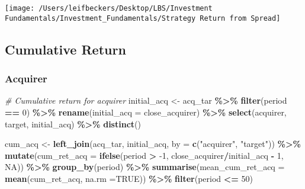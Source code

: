 \documentclass[
]{article}
\newenvironment{Shaded}{\begin{snugshade}}{\end{snugshade}}
\newcommand{\CommentTok}[1]{\textcolor[rgb]{0.56,0.35,0.01}{\textit{#1}}}
\newcommand{\DataTypeTok}[1]{\textcolor[rgb]{0.13,0.29,0.53}{#1}}
\newcommand{\DecValTok}[1]{\textcolor[rgb]{0.00,0.00,0.81}{#1}}
\newcommand{\KeywordTok}[1]{\textcolor[rgb]{0.13,0.29,0.53}{\textbf{#1}}}
\newcommand{\NormalTok}[1]{#1}
\newcommand{\OperatorTok}[1]{\textcolor[rgb]{0.81,0.36,0.00}{\textbf{#1}}}
\newcommand{\OtherTok}[1]{\textcolor[rgb]{0.56,0.35,0.01}{#1}}
\newcommand{\StringTok}[1]{\textcolor[rgb]{0.31,0.60,0.02}{#1}}
\begin{document}
\begin{center}\texttt{[image: /Users/leifbeckers/Desktop/LBS/Investment Fundamentals/Investment\_Fundamentals/Strategy Return from Spread]} \end{center}

\hypertarget{cumulative-return}{%
\subsection{Cumulative Return}\label{cumulative-return}}

\hypertarget{acquirer}{%
\subsubsection{Acquirer}\label{acquirer}}

\begin{Shaded}
\begin{Highlighting}[]
\CommentTok{\# Cumulative return for acquirer}
\NormalTok{initial\_acq \textless{}{-}}\StringTok{ }\NormalTok{acq\_tar }\OperatorTok{\%\textgreater{}\%}
\StringTok{  }\KeywordTok{filter}\NormalTok{(period }\OperatorTok{==}\StringTok{ }\DecValTok{0}\NormalTok{) }\OperatorTok{\%\textgreater{}\%}
\StringTok{  }\KeywordTok{rename}\NormalTok{(}\DataTypeTok{initial\_acq =}\NormalTok{ close\_acquirer) }\OperatorTok{\%\textgreater{}\%}
\StringTok{  }\KeywordTok{select}\NormalTok{(acquirer, target, initial\_acq) }\OperatorTok{\%\textgreater{}\%}
\StringTok{  }\KeywordTok{distinct}\NormalTok{()}

\NormalTok{cum\_acq \textless{}{-}}\StringTok{ }\KeywordTok{left\_join}\NormalTok{(acq\_tar, initial\_acq, }\DataTypeTok{by =} \KeywordTok{c}\NormalTok{(}\StringTok{"acquirer"}\NormalTok{, }\StringTok{"target"}\NormalTok{)) }\OperatorTok{\%\textgreater{}\%}
\StringTok{  }\KeywordTok{mutate}\NormalTok{(}\DataTypeTok{cum\_ret\_acq =} \KeywordTok{ifelse}\NormalTok{(period }\OperatorTok{\textgreater{}}\StringTok{ }\DecValTok{{-}1}\NormalTok{, close\_acquirer}\OperatorTok{/}\NormalTok{initial\_acq }\OperatorTok{{-}}\StringTok{ }\DecValTok{1}\NormalTok{, }\OtherTok{NA}\NormalTok{)) }\OperatorTok{\%\textgreater{}\%}
\StringTok{  }\KeywordTok{group\_by}\NormalTok{(period) }\OperatorTok{\%\textgreater{}\%}
\StringTok{  }\KeywordTok{summarise}\NormalTok{(}\DataTypeTok{mean\_cum\_ret\_acq =} \KeywordTok{mean}\NormalTok{(cum\_ret\_acq, }\DataTypeTok{na.rm =}\OtherTok{TRUE}\NormalTok{)) }\OperatorTok{\%\textgreater{}\%}
\StringTok{  }\KeywordTok{filter}\NormalTok{(period }\OperatorTok{\textless{}=}\StringTok{ }\DecValTok{50}\NormalTok{)}
\end{Highlighting}
\end{Shaded}
\end{document}
